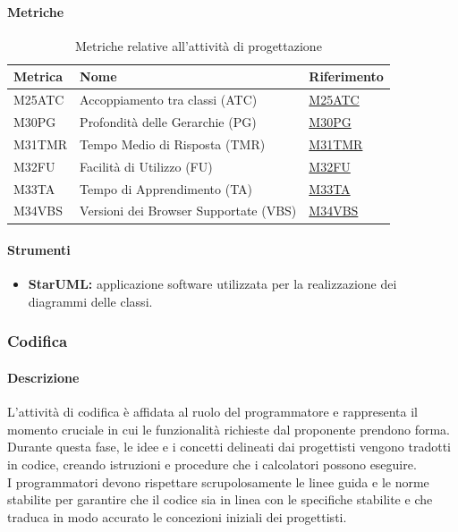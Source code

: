 \paragraph{Metriche}
\begin{table}[H]
    \centering
    \begin{tabular}{|C{3cm}|C{3cm}|C{4cm}|}
    \hline
    Metrica & Nome & Riferimento \\
    \hline \hline
    M25ATC & Accoppiamento tra classi (ATC) & \hyperlink{item:M25ATC}{M25ATC}\\
    M30PG & Profondità delle Gerarchie (PG) &  \hyperlink{item:M30PG}{M30PG}\\
    M31TMR & Tempo Medio di Risposta (TMR) & \hyperlink{item:M31TMR}{M31TMR}\\
    M32FU & Facilità di Utilizzo (FU) & \hyperlink{item:M32FU}{M32FU}\\
    M33TA & Tempo di Apprendimento (TA) & \hyperlink{item:M33TA}{M33TA}\\
    M34VBS & Versioni dei Browser Supportate (VBS) & \hyperlink{item:M34VBS}{M34VBS}\\
    \hline
    \end{tabular}
    \caption{Metriche relative all'attività di progettazione}
\end{table}

\paragraph{Strumenti}
\begin{itemize}
    \item \textbf{StarUML:} applicazione software utilizzata per la realizzazione dei diagrammi delle classi.
\end{itemize}

\subsubsection{Codifica}
\paragraph{Descrizione}
L'attività di codifica è affidata al ruolo del programmatore e rappresenta il momento cruciale in cui le funzionalità richieste dal proponente prendono forma. \\
Durante questa fase, le idee e i concetti delineati dai progettisti vengono tradotti in codice, creando istruzioni e procedure che i calcolatori possono eseguire. \\
I programmatori devono rispettare scrupolosamente le linee guida e le norme stabilite per garantire che il codice sia in linea con le specifiche stabilite e che traduca in modo accurato le concezioni iniziali dei progettisti.
